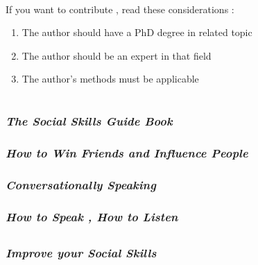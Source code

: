 \documentclass[12pt, a4paper]{article}
\begin{document}
\newpage

\begin{large}
\paragraph{}
If you want to contribute , read these considerations :

\begin{enumerate}

\item The author should have a PhD degree in related topic
\item The author should be an expert in that field
\item The author's methods must be applicable

\end{enumerate}

\end{large}

\newpage

\section*{}
\subsubsection*{\emph{The Social Skills Guide Book}}
\subsubsection*{\emph{How to Win Friends and Influence People}}
\subsubsection*{\emph{Conversationally Speaking}}
\subsubsection*{\emph{How to Speak , How to Listen}\\}

\subsection*{}
\subsubsection*{\emph{Improve your Social Skills}\\}
\end{document}
